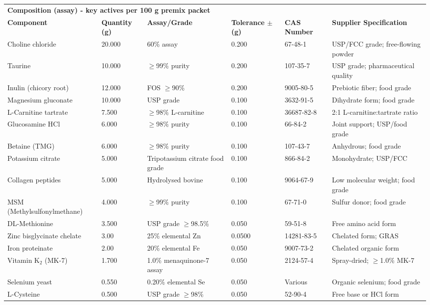 \begin{longtable}{@{}p{6.0cm}p{1.5cm}p{1.8cm}p{2.0cm}p{3.0cm}p{3.0cm}@{}}
\multicolumn{6}{l}{\textbf{Composition (assay) - key actives per 100 g premix packet}}  \\[3pt]
\textbf{Component} & \textbf{Quantity (g)} & \textbf{Assay/Grade} & \textbf{Tolerance $\pm$ (g)} & \textbf{CAS Number} & \textbf{Supplier Specification} \\
\midrule
Choline chloride & 20.000 & 60\% assay & 0.200 & 67-48-1 & USP/FCC grade; free-flowing powder \\[3pt]
Taurine & 10.000 & $\ge$99\% purity & 0.200 & 107-35-7 & USP grade; pharmaceutical quality \\[3pt]
Inulin (chicory root) & 12.000 & FOS $\ge$90\% & 0.200 & 9005-80-5 & Prebiotic fiber; food grade \\[3pt]
Magnesium gluconate & 10.000 & USP grade & 0.100 & 3632-91-5 & Dihydrate form; food grade \\[3pt]
L-Carnitine tartrate & 7.500 & $\ge$98\% L-carnitine & 0.100 & 36687-82-8 & 2:1 L-carnitine:tartrate ratio \\[3pt]
Glucosamine HCl & 6.000 & $\ge$98\% purity & 0.100 & 66-84-2 & Joint support; USP/food grade \\[3pt]
Betaine (TMG) & 6.000 & $\ge$98\% purity & 0.100 & 107-43-7 & Anhydrous; food grade \\[3pt]
Potassium citrate & 5.000 & Tripotassium citrate food grade & 0.100 & 866-84-2 & Monohydrate; USP/FCC \\[3pt]
Collagen peptides & 5.000 & Hydrolysed bovine & 0.100 & 9064-67-9 & Low molecular weight; food grade \\[3pt]
MSM (Methylsulfonylmethane) & 4.000 & $\ge$99\% purity & 0.100 & 67-71-0 & Sulfur donor; food grade \\[3pt]
DL-Methionine & 3.500 & USP grade $\ge$98.5\% & 0.050 & 59-51-8 & Free amino acid form \\[3pt]
Zinc bisglycinate chelate & 3.00 & 25\% elemental Zn & 0.0500 & 14281-83-5 & Chelated form; GRAS \\[3pt]
Iron proteinate & 2.00 & 20\% elemental Fe & 0.050 & 9007-73-2 & Chelated organic form \\[3pt]
Vitamin K$_2$ (MK-7) & 1.700 & 1.0\% menaquinone-7 assay & 0.050 & 2124-57-4 & Spray-dried; $\ge$1.0\% MK-7 \\[3pt]
Selenium yeast & 0.550 & 0.20\% elemental Se & 0.050 & Various & Organic selenium; food grade \\[3pt]
L-Cysteine & 0.500 & USP grade $\ge$98\% & 0.050 & 52-90-4 & Free base or HCl form \\[3pt]

\end{longtable}
